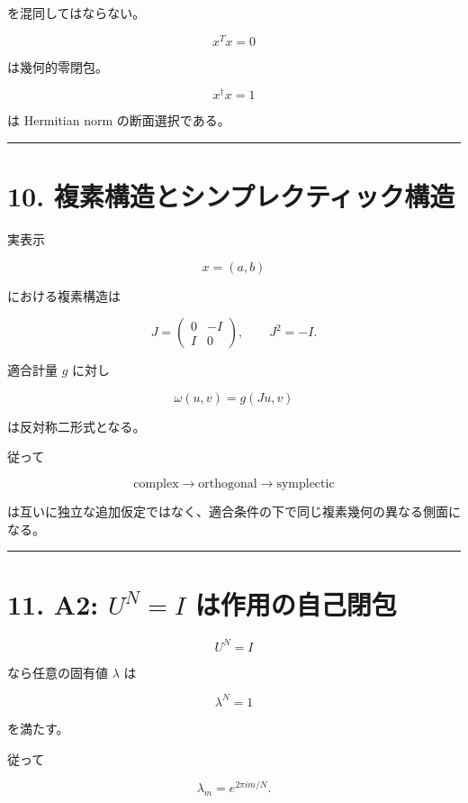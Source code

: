 \documentclass[
  a4paper,
]{ltjsarticle}
\begin{document}
を混同してはならない。

\[
\boxed{
x^Tx=0
}
\]

は幾何的零閉包。

\[
\boxed{
x^\dagger x=1
}
\]

は Hermitian norm の断面選択である。

\begin{center}\rule{0.5\linewidth}{0.5pt}\end{center}

\section{10.
複素構造とシンプレクティック構造}\label{ux8907ux7d20ux69cbux9020ux3068ux30b7ux30f3ux30d7ux30ecux30afux30c6ux30a3ux30c3ux30afux69cbux9020}

実表示

\[
x=(a,b)
\]

における複素構造は

\[
J=
\begin{pmatrix}
0&-I\\
I&0
\end{pmatrix},
\qquad
J^2=-I.
\]

適合計量 \(g\) に対し

\[
\omega(u,v)=g(Ju,v)
\]

は反対称二形式となる。

従って

\[
\boxed{
\text{complex}
\to
\text{orthogonal}
\to
\text{symplectic}
}
\]

は互いに独立な追加仮定ではなく、適合条件の下で同じ複素幾何の異なる側面になる。

\begin{center}\rule{0.5\linewidth}{0.5pt}\end{center}

\section{\texorpdfstring{11. A2: \(U^N=I\)
は作用の自己閉包}{11. A2: U\^{}N=I は作用の自己閉包}}\label{a2-uni-ux306fux4f5cux7528ux306eux81eaux5df1ux9589ux5305}

\[
\boxed{
U^N=I
}
\]

なら任意の固有値 \(\lambda\) は

\[
\lambda^N=1
\]

を満たす。

従って

\[
\boxed{
\lambda_m=e^{2\pi i m/N}
}.
\]
\end{document}
